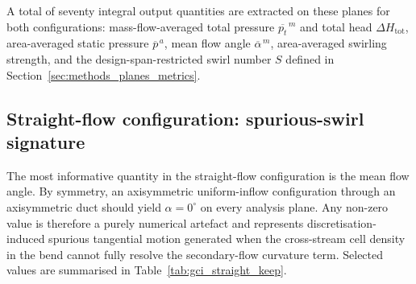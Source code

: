 A total of seventy integral output quantities are extracted on these planes for both configurations: mass-flow-averaged total pressure $\overline{p_t}^{\,m}$ and total head $\Delta H_{\mathrm{tot}}$, area-averaged static pressure $\overline{p}^{\,a}$, mean flow angle $\overline{\alpha}^{\,m}$, area-averaged swirling strength, and the design-span-restricted swirl number $S$ defined in Section~\ref{sec:methods_planes_metrics}.

\subsection{Straight-flow configuration: spurious-swirl signature}
\label{sec:gci_straight}

The most informative quantity in the straight-flow configuration is the mean flow angle. By symmetry, an axisymmetric uniform-inflow configuration through an axisymmetric duct should yield $\alpha = 0^\circ$ on every analysis plane. Any non-zero value is therefore a purely numerical artefact and represents discretisation-induced spurious tangential motion generated when the cross-stream cell density in the bend cannot fully resolve the secondary-flow curvature term. Selected values are summarised in Table~\ref{tab:gci_straight_keep}.

